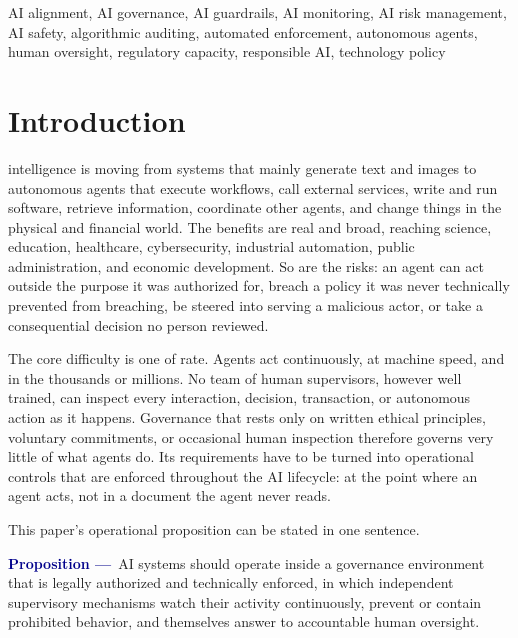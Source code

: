 \documentclass{ieeeaccess}
\begin{document}
\begin{keywords}
AI alignment, AI governance, AI guardrails, AI monitoring, AI risk management, AI safety, algorithmic auditing, automated enforcement, autonomous agents, human oversight, regulatory capacity, responsible AI, technology policy
\end{keywords}

\titlepgskip=-21pt

\maketitle

\section{Introduction}
\label{sec:intro}

 intelligence is moving from systems that mainly generate text and images to autonomous agents that execute workflows, call external services, write and run software, retrieve information, coordinate other agents, and change things in the physical and financial world. The benefits are real and broad, reaching science, education, healthcare, cybersecurity, industrial automation, public administration, and economic development. So are the risks: an agent can act outside the purpose it was authorized for, breach a policy it was never technically prevented from breaching, be steered into serving a malicious actor, or take a consequential decision no person reviewed.

The core difficulty is one of rate. Agents act continuously, at machine speed, and in the thousands or millions. No team of human supervisors, however well trained, can inspect every interaction, decision, transaction, or autonomous action as it happens. Governance that rests only on written ethical principles, voluntary commitments, or occasional human inspection therefore governs very little of what agents do. Its requirements have to be turned into operational controls that are enforced throughout the AI lifecycle: at the point where an agent acts, not in a document the agent never reads.

This paper's operational proposition can be stated in one sentence.

\begin{mdframed}[linecolor=darkblue, linewidth=1.2pt, backgroundcolor=darkblue!5,
  innerleftmargin=8pt, innerrightmargin=8pt, innertopmargin=6pt, innerbottommargin=6pt,
  roundcorner=4pt]
\noindent\textcolor{darkblue}{\bfseries Proposition ---}~AI systems should operate inside a governance environment that is legally authorized and technically enforced, in which independent supervisory mechanisms watch their activity continuously, prevent or contain prohibited behavior, and themselves answer to accountable human oversight.
\end{mdframed}
\end{document}
